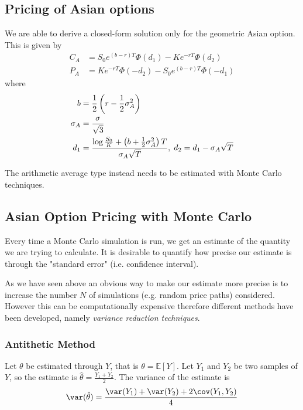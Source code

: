 \subsection{Pricing of Asian options}
We are able to derive a closed-form solution only for the geometric Asian option.
This is given by 
\begin{equation}
\begin{aligned}
C_A&=S_{0}e^{(b-r)T}\Phi (d_{1})-Ke^{-rT}\Phi (d_{2})\\
P_A&=Ke^{-rT}\Phi (-d_{2})-S_{0}e^{(b-r)T}\Phi (-d_{1})
\end{aligned}
\end{equation}
where 
\begin{equation}
\begin{aligned}
b&={1 \over {2}}\left(r-{1 \over {2}}\sigma _A^{2}\right)\\
\sigma _A&={\sigma  \over {\sqrt {3}}} \\
d_1&={\log {S_0 \over {K}}+\left(b+{1 \over {2}}\sigma _A^2\right)T \over {\sigma_A{\sqrt {T}}}},\;d_{2}=d_1-\sigma_A{\sqrt {T}}
\end{aligned}
\end{equation}

The arithmetic average type instead needs to be estimated with Monte Carlo techniques.

\subsection{Asian Option Pricing with Monte Carlo}

Every time a Monte Carlo simulation is run, we get an estimate of the quantity we are trying to calculate. It is desirable to quantify how precise our estimate is through the "standard error" (i.e. confidence interval).

As we have seen above an obvious way to make our estimate more precise is to increase the number $N$ of simulations (e.g. random price paths) considered. However this can be computationally expensive therefore different methods have been developed, namely \emph{variance reduction techniques}.

\subsubsection{Antithetic Method}
Let $\theta$ be estimated through $Y$, that is $\theta=\mathbb{E}[Y]$. Let $Y_1$ and $Y_2$ be two samples of $Y$, so the estimate is $\hat{\theta}=\frac{Y_1+Y_2}{2}$. The variance of the estimate is 
\begin{equation*}
\var(\hat{\theta}) = \frac{\var(Y_1)+\var(Y_2)+2\cov(Y_1,Y_2)}{4}
\end{equation*}

